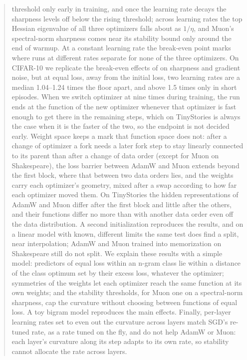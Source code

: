 \documentclass[10pt]{article}
\begin{document}
\begin{abstract}
threshold only early in training, and once the learning rate decays the sharpness levels off below the rising
threshold; across learning rates the top Hessian eigenvalue of all three optimizers falls about as $1/\eta$, and
Muon's spectral-norm sharpness comes near its stability bound only around the end of warmup. At a constant learning
rate the break-even point marks where runs at different rates separate for none of the three optimizers. On
CIFAR-10 we replicate the break-even effects of
\citet{jastrzebski2020breakeven} on sharpness and gradient noise, but at equal loss, away from the initial loss,
two learning rates are a median 1.04--1.24 times the floor apart, and above 1.5 times only in short episodes. When we switch optimizer at nine times during
training, the run ends at the function of the new optimizer whenever that optimizer is fast enough to get there
in the remaining steps, which on TinyStories is always the case when it is the faster of the two, so the endpoint
is not decided early. Weight space keeps a mark that function space does not: after a change of optimizer a fork
needs a later fork step to stay linearly connected to its parent than after a change of data order (except for
Muon on Shakespeare), the loss barrier between AdamW and Muon extends beyond the first block, where that between
two data orders lies, and the weights carry each optimizer's geometry, mixed after a swap according to how far
each optimizer moved them. On TinyStories the hidden representations of AdamW and Muon differ after the first
block and little after the others, and their functions differ no more than with another data order even off the
data distribution. A second initialization reproduces the results, and on a linear model with known, different
limits the same test does find a split, near interpolation; AdamW and Muon trained into memorization on
Shakespeare still do not split. We explain these results with a simple model: predictors of equal loss within an
n-gram class lie within a distance of the class optimum set by their excess loss, whatever the optimizer;
symmetries of the weights let each optimizer reach the same function at its own weights; and the stability
thresholds, for Muon one on a spectral-norm sharpness, cap the curvature without choosing between functions of
equal loss. A toy bigram model reproduces the main effects. Finally, per-layer learning rates set to even out the
curvature across layers match SGD's re-tuned rate, as a rate tuned on the fly, and do not help AdamW or Muon: each
layer's curvature along its step adapts to its own rate, so stability cannot allocate the rate across layers.
\end{abstract}
\end{document}
